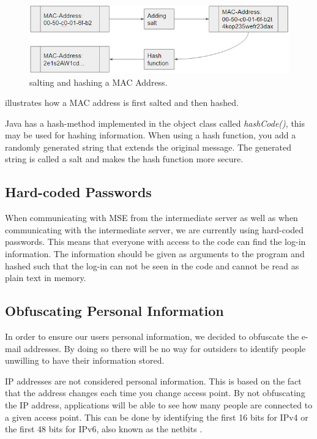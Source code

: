 \begin{figure}[ht]
	\begin{center}
		\includegraphics[scale=0.9]{graphics/salt.png}
		\caption{salting and hashing a MAC Address.}
		\label{fig:salt}
	\end{center} 
\end{figure}

 illustrates how a MAC address is first salted and then hashed.

Java has a hash-method implemented in the object class called \textit{hashCode()}, this may be used for hashing information. When using a hash function, you add a randomly generated string that extends the original message. The generated string is called a salt and makes the hash function more secure.

\subsection*{Hard-coded Passwords}
When communicating with MSE from the intermediate server as well as when communicating with the intermediate server, we are currently using hard-coded passwords. This means that everyone with access to the code can find the log-in information. The information should be given as arguments to the program and hashed such that the log-in can not be seen in the code and cannot be read as plain text in memory. 

 
\subsection*{Obfuscating Personal Information}
In order to ensure our users personal information, we decided to obfuscate the e-mail addresses. By doing so there will be no way for outsiders to identify people unwilling to have their information stored.

IP addresses are not considered personal information. This is based on the fact that the address changes each time you change access point. By not obfuscating the IP address, applications will be able to see how many people are connected to a given access point. This can be done by identifying the first 16 bits for IPv4 or the first 48 bits for IPv6, also known as the netbits \cite{IPnetworkID}.